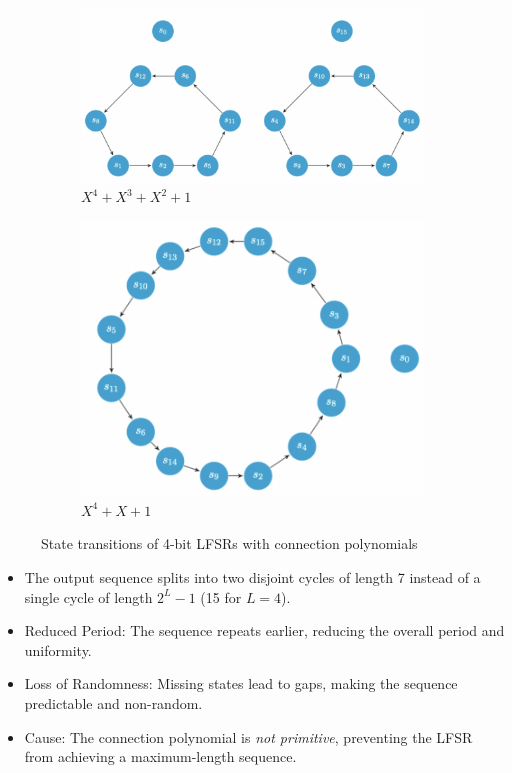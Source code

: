 \begin{figure}[h]
    \centering
    \begin{subfigure}{0.45\textwidth}
        \centering
        \includegraphics[width=\textwidth]{img/lfsrperiod1.png}
        \caption{$X^4+X^3 + X^2 + 1$}
    \end{subfigure}
    \hfill
    \begin{subfigure}{0.45\textwidth}
        \centering
        \includegraphics[width=\textwidth]{img/lfsrperiod2.png}
        \caption{$X^4 + X + 1$}
    \end{subfigure}
    \caption{State transitions of 4-bit LFSRs with connection polynomials}
    \label{fig:lfsr-period}
\end{figure}

\begin{itemize}
    \item The output sequence splits into two disjoint cycles of length 7 instead of a single cycle of length \( 2^L - 1 \) (15 for \( L = 4 \)).
    \item Reduced Period: The sequence repeats earlier, reducing the overall period and uniformity.
    \item Loss of Randomness: Missing states lead to gaps, making the sequence predictable and non-random.
    \item Cause: The connection polynomial is \textit{not primitive}, preventing the LFSR from achieving a maximum-length sequence.
\end{itemize}

